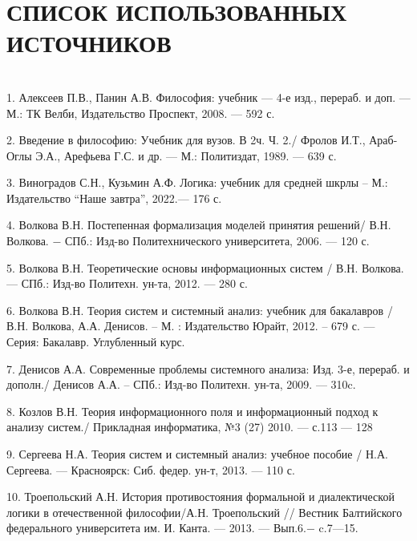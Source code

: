 \documentclass[a4paper,12pt]{report}
\begin{document}
	\chapter*{СПИСОК ИСПОЛЬЗОВАННЫХ ИСТОЧНИКОВ} 
\\

1.  Алексеев П.В., Панин А.В. Философия: учебник —  4-е изд., перераб. и доп. —  М.: ТК Велби, Издательство Проспект, 2008. —  592 с.

2. Введение в философию: Учебник для вузов. В 2ч. Ч. 2./ Фролов И.Т., Араб-Оглы Э.А., Арефьева Г.С. и др. —  М.: Политиздат, 1989. —  639 с.

3. Виноградов С.Н., Кузьмин А.Ф. Логика: учебник для средней шкрлы – М.: Издательство “Наше завтра”, 2022.— 176 с.

4. Волкова В.Н. Постепенная формализация моделей принятия решений/ В.Н. Волкова. −  СПб.: Изд-во Политехнического университета, 2006. — 120 с.

5. Волкова В.Н. Теоретические основы информационных систем / В.Н. Волкова. — СПб.: Изд-во Политехн. ун-та, 2012. — 280 с.

6. Волкова В.Н. Теория систем и системный анализ: учебник для бакалавров /В.Н. Волкова, А.А. Денисов.  – М. : Издательство Юрайт, 2012. – 679 с. — Серия: Бакалавр. Углубленный курс.

7. Денисов А.А. Современные проблемы системного анализа: Изд. 3-е, перераб.  и дополн./ Денисов А.А. – СПб.: Изд-во Политехн. ун-та, 2009. — 310c.

8. Козлов В.Н. Теория информационного поля и информационный подход к анализу систем./ Прикладная информатика, №3 (27) 2010. —  с.113 — 128

9. Сергеева Н.А. Теория систем и системный анализ: учебное пособие / Н.А. Сергеева. —  Красноярск: Сиб. федер. ун-т, 2013. —  110 с.

10. Троепольский А.Н. История противостояния формальной и диалектической логики в отечественной философии/А.Н. Троепольский // Вестник Балтийского федерального университета им. И. Канта. —  2013. —  Вып.6.−  c.7—15.

    
    
    
   	
\end{document}
